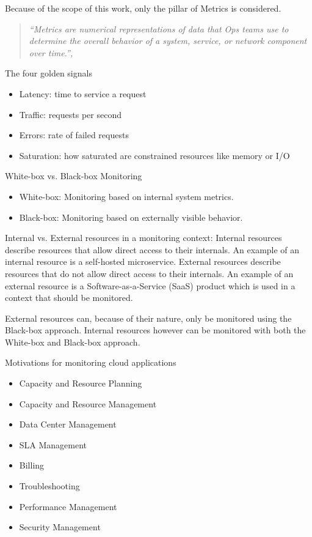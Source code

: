 Because of the scope of this work, only the pillar of Metrics is considered.

\begin{quote}
\textit{``Metrics are numerical representations of data that Ops teams use to determine the overall behavior of a system, service, or network component over time.'', \cite{9837035}}
\end{quote}

The four golden signals \cite{Beyer2016-xi}
\begin{itemize}
    \item Latency: time to service a request
    \item Traffic: requests per second
    \item Errors: rate of failed requests
    \item Saturation: how saturated are constrained resources like memory or I/O
\end{itemize}

White-box vs. Black-box Monitoring \cite{Beyer2016-xi}
\begin{itemize}
    \item White-box: Monitoring based on internal system metrics.
    \item Black-box: Monitoring based on externally visible behavior.
\end{itemize}

Internal vs. External resources in a monitoring context:
Internal resources describe resources that allow direct access to their internals.
An example of an internal resource is a self-hosted microservice.
External resources describe resources that do not allow direct access to their internals.
An example of an external resource is a Software-as-a-Service (SaaS) product which is used in a context that should be monitored.

External resources can, because of their nature, only be monitored using the Black-box approach.
Internal resources however can be monitored with both the White-box and Black-box approach.

Motivations for monitoring cloud applications \cite{6483656}
\begin{itemize}
    \item Capacity and Resource Planning
    \item Capacity and Resource Management
    \item Data Center Management
    \item SLA Management
    \item Billing
    \item Troubleshooting
    \item Performance Management
    \item Security Management
\end{itemize}

